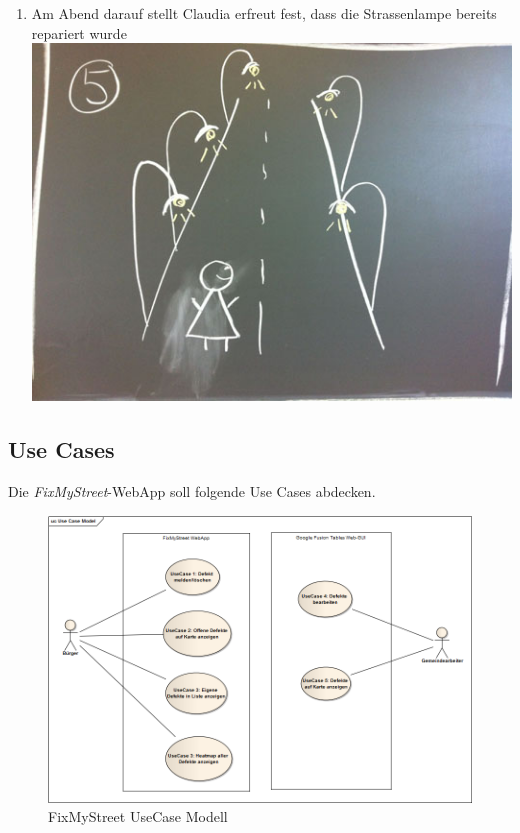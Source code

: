 \begin{enumerate}
\item Am Abend darauf stellt Claudia erfreut fest, dass die Strassenlampe bereits repariert wurde \\ \includegraphics[scale=0.4]{images/usecase2-fixmystreet/storyboard/fixmystreet-storyboard-5.jpg}
\end{enumerate}

\subsection{Use Cases}
Die \emph{FixMyStreet}-WebApp soll folgende Use Cases abdecken.

\begin{figure}[H]
	\centering
	\includegraphics[scale=0.4]{images/usecase2-fixmystreet/uml/fixmystreet-usecasemodel.png}
	\caption{FixMyStreet UseCase Modell}
	\label{fixmystreet-usecasemodel}
\end{figure}

